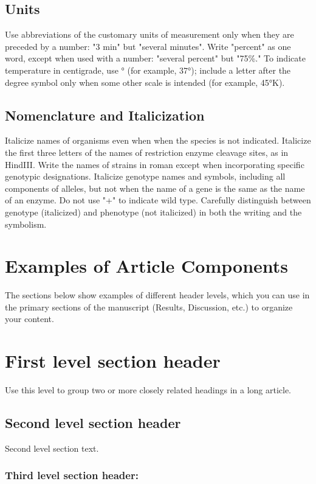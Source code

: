 \documentclass[9pt,twocolumn,twoside]{gsajnl}
\begin{document}
\subsection*{Units} Use abbreviations of the customary units of measurement only when they are preceded by a number: "3 min" but "several minutes". Write "percent" as one word, except when used with a number: "several percent" but "75\%." To indicate temperature in centigrade, use ° (for example, 37°); include a letter after the degree symbol only when some other scale is intended (for example, 45°K).

\subsection*{Nomenclature and Italicization} Italicize names of organisms even when  when the species is not indicated.  Italicize the first three letters of the names of restriction enzyme cleavage sites, as in HindIII. Write the names of strains in roman except when incorporating specific genotypic designations. Italicize genotype names and symbols, including all components of alleles, but not when the name of a gene is the same as the name of an enzyme. Do not use "+" to indicate wild type. Carefully distinguish between genotype (italicized) and phenotype (not italicized) in both the writing and the symbolism.

\section*{Examples of Article Components}
\label{sec:examples}

The sections below show examples of different header levels, which you can use in the primary sections of the manuscript (Results, Discussion, etc.) to organize your content.

\section*{First level section header}

Use this level to group two or more closely related headings in a long article.

\subsection*{Second level section header}

Second level section text.

\subsubsection*{Third level section header:}
\end{document}
